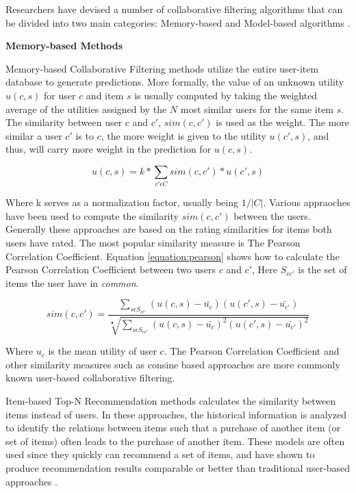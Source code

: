 Researchers have devised a number of collaborative filtering algorithms that can be divided into two main categories: Memory-based and Model-based algorithms \cite{Su2009}.

\textbf{Memory-based Methods}

Memory-based Collaborative Filtering methods utilize the entire user-item database to generate predictions. More formally, the value of an unknown utility $u(c,s)$ for user $c$ and item $s$ is usually computed by taking the weighted average of the utilities assigned by the $N$ most similar users for the same item $s$. The similarity between user $c$ and $c'$, $sim(c, c')$ is used as the weight. The more similar a user $c'$ is to $c$, the more weight is given to the utility $u(c', s)$, and thus, will carry more weight in the prediction for $u(c,s)$.

\begin{equation}
\label{equation:cfratingprediction}
u(c,s) = k * \sum_{c' \epsilon C} sim(c, c') * u(c',s)
\end{equation}

Where k serves as a normalization factor, usually being $1/|C|$. Various appraoches have been used to compute the similarity $sim(c, c')$ between the users. Generally these approaches are based on the rating similarities for items both users have rated. The most popular similarity measure is The Pearson Correlation Coefficient. Equation \ref{equation:pearson} shows how to calculate the Pearson Correlation Coefficient between two users $c$ and $c'$, Here $S_{cc'}$ is the set of items the user have in \emph{common}.

\begin{equation}
sim(c, c') = \frac{\sum_{s \epsilon S_{cc'}} (u(c, s)-\bar{u_{c}})(u(c',s)-\bar{u_{c'}})}{\sqrt[•]{\sum_{s \epsilon S_{cc'}} (u(c, s)-\bar{u_{c}})^{2}(u(c',s)-\bar{u_{c'}})^{2}}}
\end{equation}

Where $u_{c}$ is the mean utility of user $c$. The Pearson Correlation Coefficient and other similarity measures such as consine based approaches are more commonly known user-based collaborative filtering.

Item-based Top-N Recommendation methods calculates the similarity between items instead of users. In these approaches, the historical information is analyzed to identify the relations between items such that a purchase of another item (or set of items) often leads to the purchase of another item. These models are often used since they quickly can recommend a set of items, and have shown to produce recommendation results comparable or better than traditional user-based approaches \cite{Karypis2001}.

